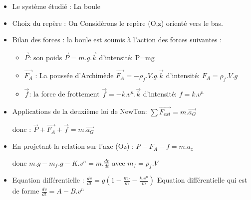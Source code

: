 \documentclass[12pt]{article}
\begin{document}
\begin{itemize}
	\item Le système étudié : {La boule }
	\item Choix du repère : On Considèrons le repère (O,z) orienté vers le bas.
	\item Bilan des forces : la boule est soumis à l'action des forces suivantes : 

		\begin{itemize}
			\item $\vec{P}$: son poids $\vec{P} =m.g.\vec{k}$ d'intensité: P=mg
			\item $\vec{F_A}$ : La poussée d'Archimède $\vec{F_A} = -\rho_f.V.g.\vec{k}$ d'intensité: $F_A=\rho_f.V.g$ 
			\item $\vec{f}$: la force de frottement $\vec{f} =-k.v^n.\vec{k}$ d'intensité: $f=k.v^n$

		\end{itemize}
	\item Applications de la deuxième loi de NewTon: $\sum \vec{F_{ext}} = m.\vec{a_G}$ 
		
		donc : $\vec{P} + \vec{F_A} + \vec{f} = m.\vec{a_G}$

	\item En projetant la relation sur l'axe (Oz) : $P-F_A-f = m.a_z$ 

		donc $m.g - m_f.g - K.v^n = m.\frac{dv}{dt}$  avec $m_f = \rho_f.V$
	\item Equation différentielle : $\frac{dv}{dt} = g(1- \frac{m_f}{m} - \frac{k.v^n}{m})$
	Equation différentielle qui est de forme $\frac{dv}{dt} = A- B.v^n$

\end{itemize}
\end{document}
